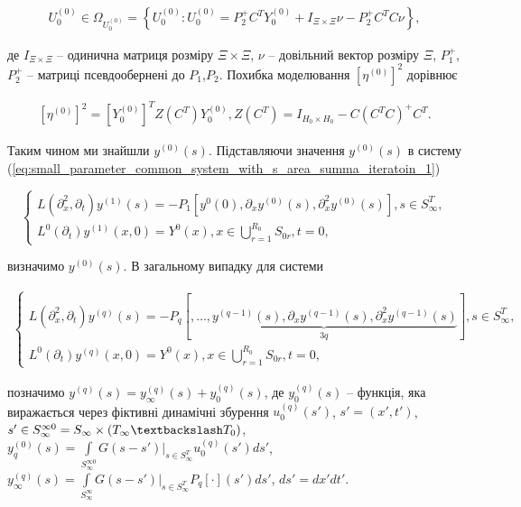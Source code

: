 \begin{gather*}
    U_{0}^{(0)}\in \Omega_{U_{0}^{(0)}} = \left\{U_{0}^{(0)} : U_{0}^{(0)} = P_{2}^{+}C^{T}Y_{0}^{(0)}
    + I_{\Xi\times\Xi}\nu -P_{2}^{+}C^{T}C\nu\right\},
\end{gather*}

де $I_{\Xi\times\Xi}$ -- одинична матриця розміру $\Xi\times\Xi$, $\nu$ -- довільний вектор розміру $\Xi$,
$P_{1}^{+}$, $P_{2}^{+}$  -- матриці псевдообернені до $P_{1}$,$P_{2}$. Похибка моделювання $\left[ \eta^{(0)} \right]^{2}$ дорівнює

\begin{gather*}
    \left[ \eta^{(0)} \right]^{2} = \left[ Y_{0}^{(0)} \right]^{T}Z\left( C^{T} \right)Y_{0}^{(0)},
    Z\left( C^{T} \right)=I_{H_{0}\times H_{0}} - C\left( C^{T} C\right)^{+}C^{T}.
\end{gather*}

Таким чином ми знайшли $y^{(0)}(s)$. Підставляючи значення $y^{(0)}(s)$ в систему (\ref{eq:small_parameter_common_system_with_s_area_summa_iteratoin_1})

\begin{equation}
    \left\{
    \label{eq:small_parameter_common_system_with_s_area_summa_iteratoin_1}
    \begin{alignedat}{2}
        L(\partial_x^2, \partial_t)y^{(1)}(s) = -P_{1}\left[ y^{0}(0), \partial_{x}
        y^{(0)}(s), \partial_{x}^{2}y^{(0)}(s) \right], s\in S_\infty^T,\\
        L^{0}(\partial_{t})y^{(1)}(x,0) = Y^{0}(x),x\in\bigcup\limits_{r=1}^{R_{0}} S_{0r},t=0,
    \end{alignedat}
    \right.
\end{equation}

визначимо $y^{(0)}(s)$.
В загальному випадку для системи

\begin{gather*}
    \left\{
    \begin{alignedat}{2}
        L(\partial_x^2, \partial_t)y^{(q)}(s) = -P_{q}
        \left[
            \underbrace{
                ,\dots,
                y^{(q-1)}(s), \partial_x y^{(q-1)}(s), \partial_x^2 y^{(q-1)}(s)
            }_{3q}
            \right], s\in S_\infty^T,\\
        L^{0}(\partial_{t})y^{(q)}(x,0) = Y^{0}(x),x\in\bigcup\limits_{r=1}^{R_{0}} S_{0r},t=0,
    \end{alignedat}
    \right.
\end{gather*}

позначимо $y^{(q)}(s)=y_{\infty}^{(q)}(s) + y_{0}^{(q)}(s)$,
де $y_{0}^{(q)}(s)$ -- функція, яка виражається через фіктивні динамічні збурення
$u^{(q)}_{0}(s')$,
$s'=(x', t')$,
$s'\in S_{\infty}^{\infty 0} = S_{\infty} \times (T_{\infty}\textbackslash T_{0})$,
$y_{q}^{(0)}(s)=\int\limits_{S_{\infty}^{\infty 0}}G(s-s')\bigg|_{s\in S_{\infty}^{T}}u_{0}^{(q)}(s')ds'$,
$y_{\infty}^{(q)}(s)=\int\limits_{S_{\infty}^{\infty}}G(s-s')\bigg|_{s\in S_{\infty}^{T}}P_{q}\left[ \cdot \right](s')ds'$,
$ds'=dx'dt'$.

